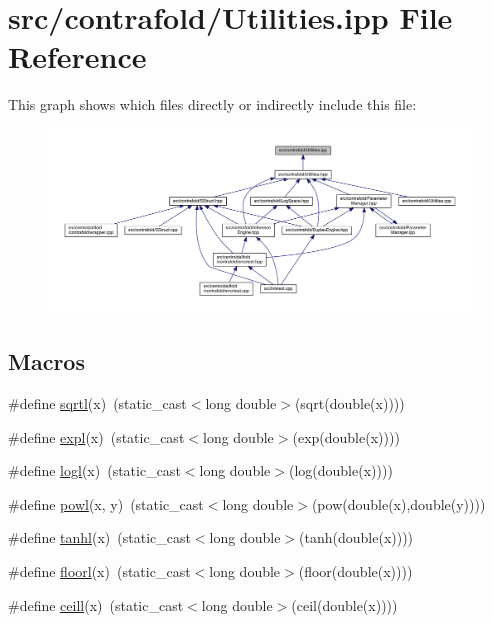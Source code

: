 \hypertarget{contrafold_2_utilities_8ipp}{\section{src/contrafold/\+Utilities.ipp File Reference}
\label{contrafold_2_utilities_8ipp}
}
This graph shows which files directly or indirectly include this file\+:
\nopagebreak
\begin{figure}[H]
\begin{center}
\leavevmode
\includegraphics[width=350pt]{contrafold_2_utilities_8ipp__dep__incl}
\end{center}
\end{figure}
\subsection*{Macros}
\begin{DoxyCompactItemize}
\item 
\#define \hyperlink{contrafold_2_utilities_8ipp_adec5708ea4f27b718663e2a57e73303a}{sqrtl}(x)~(static\+\_\+cast$<$long double$>$(sqrt(double(x))))
\item 
\#define \hyperlink{contrafold_2_utilities_8ipp_a3262d247d0e746116959ee487aed42e1}{expl}(x)~(static\+\_\+cast$<$long double$>$(exp(double(x))))
\item 
\#define \hyperlink{contrafold_2_utilities_8ipp_af30ed28c10eaaab05f92d1043d458741}{logl}(x)~(static\+\_\+cast$<$long double$>$(log(double(x))))
\item 
\#define \hyperlink{contrafold_2_utilities_8ipp_a38ce40625edb986ea847a15a34615cc1}{powl}(x, y)~(static\+\_\+cast$<$long double$>$(pow(double(x),double(y))))
\item 
\#define \hyperlink{contrafold_2_utilities_8ipp_a99028516a5b84b8232290731299c72cd}{tanhl}(x)~(static\+\_\+cast$<$long double$>$(tanh(double(x))))
\item 
\#define \hyperlink{contrafold_2_utilities_8ipp_a0ea134b0841e1599acca1a6798ef4607}{floorl}(x)~(static\+\_\+cast$<$long double$>$(floor(double(x))))
\item 
\#define \hyperlink{contrafold_2_utilities_8ipp_a8bd1d8e6a787be7c41651531bb76e2f8}{ceill}(x)~(static\+\_\+cast$<$long double$>$(ceil(double(x))))
\end{DoxyCompactItemize}
